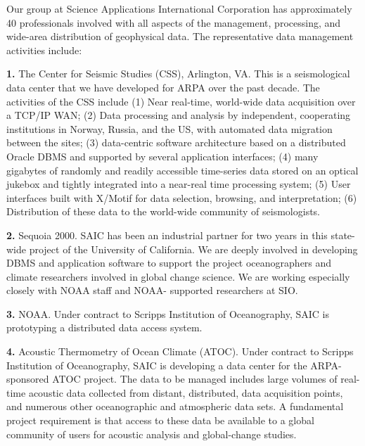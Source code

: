 	Our group at Science Applications International Corporation has 
approximately 40 professionals involved with all aspects of the 
management, processing, and wide-area distribution of geophysical data.  
The representative data management activities include:
\begin{description}

\item{\bf 1.}	The Center for Seismic Studies (CSS), Arlington, VA.  This is
a seismological data center that we have developed for ARPA over the past
decade.  The activities of the CSS include (1) Near real-time, world-wide
data acquisition over a TCP/IP WAN; (2) Data processing and analysis by
independent, cooperating institutions in Norway, Russia, and the US, with
automated data migration between the sites; (3) data-centric software
architecture based on a distributed Oracle DBMS and supported by several
application interfaces; (4) many gigabytes of randomly and readily accessible
time-series data stored on an optical jukebox and tightly integrated into a
near-real time processing system; (5) User interfaces built with X/Motif for
data selection, browsing, and interpretation; (6) Distribution of these data
to the world-wide community of seismologists.

\item{\bf 2.}	Sequoia 2000.  SAIC has been an industrial partner for two
years in this state-wide project of the University of California.  We are
deeply involved in developing DBMS and application software to support the
project oceanographers and climate researchers involved in global change
science.  We are working especially closely with NOAA staff and NOAA-
supported researchers at SIO.

\item{\bf 3.}	NOAA.  Under contract to Scripps Institution of Oceanography,
SAIC is prototyping a distributed data access system.

\item{\bf 4.}	Acoustic Thermometry of Ocean Climate (ATOC).  Under contract
to Scripps Institution of Oceanography, SAIC is developing a data center for
the ARPA-sponsored ATOC project.  The data to be managed includes large
volumes of real-time acoustic data collected from distant, distributed, data
acquisition points, and numerous other oceanographic and atmospheric data
sets.  A fundamental project requirement is that access to these data be
available to a global community of users for acoustic analysis and
global-change studies.

\end{description}
\newpage

